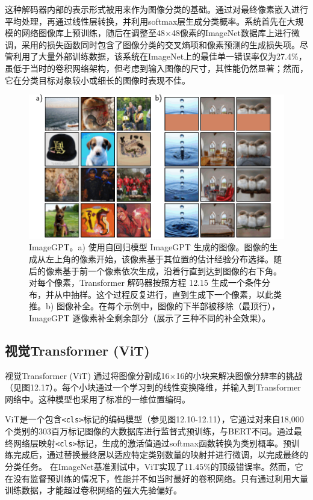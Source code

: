 \documentclass[lang=cn,newtx,10pt,scheme=chinese]{elegantbook}
\begin{document}
这种解码器内部的表示形式被用来作为图像分类的基础。通过对最终像素嵌入进行平均处理，再通过线性层转换，并利用softmax层生成分类概率。系统首先在大规模的网络图像库上预训练，随后在调整至48×48像素的ImageNet数据库上进行微调，采用的损失函数同时包含了图像分类的交叉熵项和像素预测的生成损失项。尽管利用了大量外部训练数据，该系统在ImageNet上的最佳单一错误率仅为27.4\%，虽低于当时的卷积网络架构，但考虑到输入图像的尺寸，其性能仍然显著；然而，它在分类目标对象较小或细长的图像时表现不佳。

\begin{figure}[ht!]
\centering
\includegraphics[width=0.7\linewidth]{PDFFigures/UDLChap12PDF/TransformerIGPT.pdf}
\caption{ImageGPT。a) 使用自回归模型 ImageGPT 生成的图像。图像的生成从左上角的像素开始，该像素基于其位置的估计经验分布选择。随后的像素基于前一个像素依次生成，沿着行直到达到图像的右下角。对每个像素，Transformer 解码器按照方程 12.15 生成一个条件分布，并从中抽样。这个过程反复进行，直到生成下一个像素，以此类推。b) 图像补全。在每个示例中，图像的下半部被移除（最顶行），ImageGPT 逐像素补全剩余部分（展示了三种不同的补全效果）。}
\end{figure}

\subsection{视觉Transformer (ViT)}
视觉Transformer (ViT) 通过将图像分割成16×16的小块来解决图像分辨率的挑战（见图12.17）。每个小块通过一个学习到的线性变换降维，并输入到Transformer网络中。这种模型也采用了标准的一维位置编码。

ViT是一个包含\texttt{\textless cls\textgreater}标记的编码模型（参见图12.10-12.11），它通过对来自18,000个类别的303百万标记图像的大数据库进行监督式预训练，与BERT不同。通过最终网络层映射\texttt{\textless cls\textgreater}标记，生成的激活值通过softmax函数转换为类别概率。预训练完成后，通过替换最终层以适应特定类别数量的映射并进行微调，以完成最终的分类任务。
在ImageNet基准测试中，ViT实现了11.45\%的顶级错误率。然而，它在没有监督预训练的情况下，性能并不如当时最好的卷积网络。只有通过利用大量训练数据，才能超过卷积网络的强大先验偏好。
\end{document}
